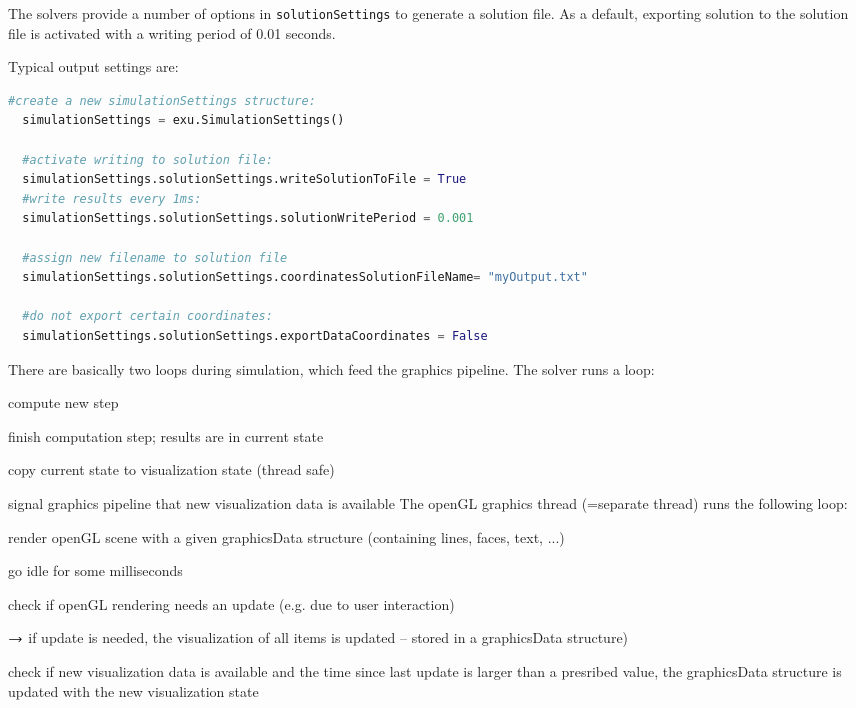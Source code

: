 %
The solvers provide a number of options in \texttt{solutionSettings} to generate a solution file. As a default, exporting solution to the solution file is activated with a writing period of 0.01 seconds.

Typical output settings are:
\pythonstyle
\begin{lstlisting}[language=Python, firstnumber=1]
  #create a new simulationSettings structure:
  simulationSettings = exu.SimulationSettings()
	
  #activate writing to solution file:
  simulationSettings.solutionSettings.writeSolutionToFile = True
  #write results every 1ms:
  simulationSettings.solutionSettings.solutionWritePeriod = 0.001
  
  #assign new filename to solution file
  simulationSettings.solutionSettings.coordinatesSolutionFileName= "myOutput.txt"

  #do not export certain coordinates:
  simulationSettings.solutionSettings.exportDataCoordinates = False
\end{lstlisting}


There are basically two loops during simulation, which feed the graphics pipeline.
The solver runs a loop:
\bi
  \item compute new step
	\item finish computation step; results are in current state
	\item copy current state to visualization state (thread safe)
	\item signal graphics pipeline that new visualization data is available
\ei
The openGL graphics thread (=separate thread) runs the following loop:
\bi
  \item render openGL scene with a given graphicsData structure (containing lines, faces, text, ...)
  \item go idle for some milliseconds
	\item check if openGL rendering needs an update (e.g. due to user interaction)
	\item[] $\rightarrow$ if update is needed, the visualization of all items is updated -- stored in a graphicsData structure)
	\item check if new visualization data is available and the time since last update is larger than a presribed value, the graphicsData structure is updated with the new visualization state
\ei


